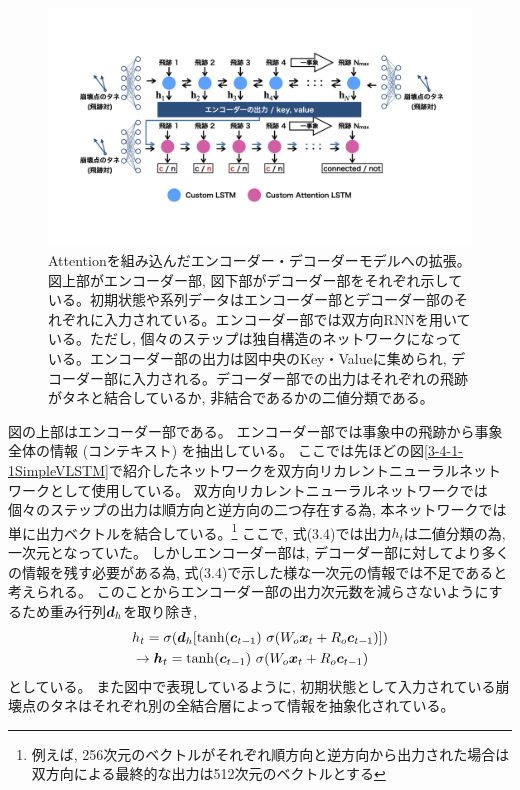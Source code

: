 \begin{figure}[htbp]
 \centering
 \includegraphics[trim = 100 200 100 100, width=1.0\textwidth, clip]{Figure/3Networks/3-4-1-4EncoderDecoderVLSTM.png}
 \caption[Attentionを組み込んだエンコーダー・デコーダーモデルへの拡張]{Attentionを組み込んだエンコーダー・デコーダーモデルへの拡張。図上部がエンコーダー部, 図下部がデコーダー部をそれぞれ示している。初期状態や系列データはエンコーダー部とデコーダー部のそれぞれに入力されている。エンコーダー部では双方向RNNを用いている。ただし, 個々のステップは独自構造のネットワークになっている。エンコーダー部の出力は図中央のKey・Valueに集められ, デコーダー部に入力される。デコーダー部での出力はそれぞれの飛跡がタネと結合しているか, 非結合であるかの二値分類である。}
 \label{3-4-1-4EncoderDecoderVLSTM}
\end{figure}

図の上部はエンコーダー部である。
エンコーダー部では事象中の飛跡から事象全体の情報 (コンテキスト) を抽出している。
ここでは先ほどの図\ref{3-4-1-1SimpleVLSTM}で紹介したネットワークを双方向リカレントニューラルネットワークとして使用している。
双方向リカレントニューラルネットワークでは個々のステップの出力は順方向と逆方向の二つ存在する為, 本ネットワークでは単に出力ベクトルを結合している。\footnote{例えば, 256次元のベクトルがそれぞれ順方向と逆方向から出力された場合は双方向による最終的な出力は512次元のベクトルとする}
ここで, 式(3.4)では出力$h_{t}$は二値分類の為, 一次元となっていた。
しかしエンコーダー部は, デコーダー部に対してより多くの情報を残す必要がある為, 式(3.4)で示した様な一次元の情報では不足であると考えられる。
このことからエンコーダー部の出力次元数を減らさないようにするため重み行列${\mbox{\boldmath{$d$}}}_h$を取り除き, 
\begin{equation}
 \begin{split}
  &h_{t} 
  = \sigma ({\mbox{\boldmath{$d$}}}_h [\tanh({\mbox{\boldmath{$c$}}}_{t-1}) \  \sigma (W_o {\mbox{\boldmath{$x$}}}_t + R_o {\mbox{\boldmath{$c$}}}_{t-1}) ])\\
  &\to {\mbox{\boldmath{$h$}}}_{t} 
  = \tanh({\mbox{\boldmath{$c$}}}_{t-1}) \  \sigma (W_o {\mbox{\boldmath{$x$}}}_t + R_o {\mbox{\boldmath{$c$}}}_{t-1})
 \end{split}
\end{equation}
としている。
また図中で表現しているように, 初期状態として入力されている崩壊点のタネはそれぞれ別の全結合層によって情報を抽象化されている。\\

